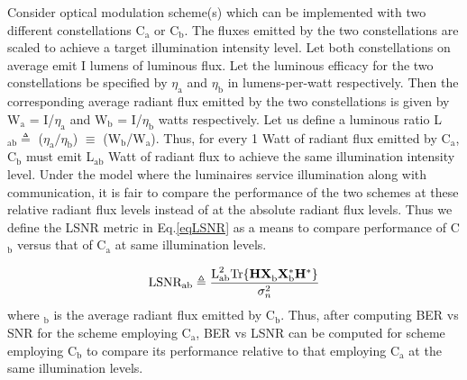 Consider optical modulation scheme(s) which can be implemented with two different constellations C$_{\text{a}}$ or C$_{\text{b}}$. The fluxes emitted by the two constellations are scaled to achieve a target illumination intensity level. Let both constellations on average emit I lumens of luminous flux. Let the luminous efficacy for the two constellations be specified by $\eta_{\text{a}}$ and $\eta_{\text{b}}$ in lumens-per-watt respectively. Then the corresponding average radiant flux emitted by the two constellations is given by W$_{\text{a}}$ = I/$\eta_{\text{a}}$ and W$_{\text{b}}$  = I/$\eta_{\text{b}}$ watts respectively. Let us define a luminous ratio L$_{\text{ab}}\triangleq$ ($\eta_{\text{a}}/\eta_{\text{b}}$) $\equiv$ (W$_{\text{b}}$/W$_{\text{a}}$). Thus, for every 1 Watt of radiant flux emitted by C$_{\text{a}}$, C$_{\text{b}}$ must emit L$_{\text{ab}}$ Watt of radiant flux to achieve the same illumination intensity level. Under the model where the luminaires service illumination along with communication, it is fair to compare the performance of the two schemes at these relative radiant flux levels instead of at the absolute radiant flux levels. Thus we define the LSNR metric in Eq.\eqref{eqLSNR} as a means to compare performance of C$_{\text{b}}$ versus that of C$_{\text{a}}$ at same illumination levels. 

\begin{equation}
	\text{LSNR}_{\text{ab}} \triangleq \frac{\text{L}^{2}_{\text{ab}}\text{Tr}\{{\bf{H}}{\bf{X}}^{ }_{\text{b}}{\bf{X}}^{*}_{\text{b}}{\bf{H}}^{*}\}}{\sigma^{2}_{n}} 
	\label{eqLSNR}
\end{equation}
where $_{\text{b}}$ is the average radiant flux emitted by C$_{\text{b}}$. Thus, after computing BER vs SNR for the scheme employing C$_{\text{a}}$, BER vs LSNR can be computed for scheme employing C$_{\text{b}}$ to compare its performance relative to that employing C$_{\text{a}}$ at the same illumination levels.


